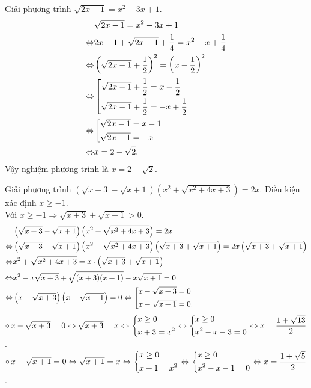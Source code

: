 \begin{bt}%
	Giải phương trình $\sqrt{2x-1}=x^2-3x+1$.
	\loigiai
	{
		\begin{align*}
		& \sqrt{2x-1}=x^2-3x+1 \\
		\Leftrightarrow & 2x-1 +\sqrt{2x-1} +\dfrac{1}{4}=x^2-x+\dfrac{1}{4}\\
		\Leftrightarrow & \left(\sqrt{2x-1} +\dfrac{1}{2}\right)^2=\left(x-\dfrac{1}{2}\right)^2 \\
		\Leftrightarrow & \left[\begin{aligned}&\sqrt{2x-1} +\dfrac{1}{2}=x-\dfrac{1}{2} \\& \sqrt{2x-1} +\dfrac{1}{2}=-x+\dfrac{1}{2}\end{aligned}\right. \\
		\Leftrightarrow & \left[\begin{aligned}&\sqrt{2x-1}=x-1 \\&\sqrt{2x-1}=-x\end{aligned}\right. \\
		\Leftrightarrow & x=2-\sqrt{2}.
		\end{align*}Vậy nghiệm phương trình là $x=2-\sqrt{2}$. 
	}
\end{bt}


\begin{bt}%
	Giải phương trình $ \left(\sqrt{x+3}-\sqrt{x+1}\right)\left(x^2+\sqrt{x^2+4x+3}\right)=2x$.
	\loigiai
	{
		Điều kiện xác định $ x\ge-1 $.\\
		Với $ x \ge-1 \Rightarrow \sqrt{x+3}+\sqrt{x+1}>0 $.
		\begin{align*}
		& \left(\sqrt{x+3}-\sqrt{x+1}\right)\left(x^2+\sqrt{x^2+4x+3}\right)=2x \\ 
		\Leftrightarrow & \left(\sqrt{x+3}-\sqrt{x+1}\right)\left(x^2+\sqrt{x^2+4x+3}\right)\left(\sqrt{x+3}+\sqrt{x+1}\right)=2x\left(\sqrt{x+3}+\sqrt{x+1}\right) \\ 
		\Leftrightarrow & x^2+\sqrt{x^2+4x+3}=x\cdot\left(\sqrt{x+3}+\sqrt{x+1}\right) \\
		\Leftrightarrow & x^2-x\sqrt{x+3}+\sqrt{(x+3)(x+1)}-x\sqrt{x+1}=0 \\
		\Leftrightarrow & \left(x-\sqrt{x+3}\right)\left(x-\sqrt{x+1}\right)=0\Leftrightarrow \left[\begin{aligned}
			& x-\sqrt{x+3}=0\\ 
			& x-\sqrt{x+1}=0.\end{aligned}\right. 		
		\end{align*}
		$\circ \, x-\sqrt{x+3}=0 \Leftrightarrow \sqrt{x+3}=x\Leftrightarrow \left\{\begin{aligned}
			& x\ge 0 \\ 
			& x+3=x^2 \\\end{aligned}\right.\Leftrightarrow \left\{\begin{aligned}
			& x\ge 0 \\ 
			& x^2-x-3=0 \\\end{aligned}\right.\Leftrightarrow x=\dfrac{1+\sqrt{13}}{2} $.\\
		$\circ \, x-\sqrt{x+1}=0 \Leftrightarrow \sqrt{x+1}=x\Leftrightarrow \left\{\begin{aligned}
			& x\ge 0 \\ 
			& x+1=x^2 \\\end{aligned}\right.\Leftrightarrow \left\{\begin{aligned}
			& x\ge 0 \\ 
			& x^2-x-1=0 \\\end{aligned}\right.\Leftrightarrow x=\dfrac{1+\sqrt{5}}{2} $. \\
	}
\end{bt}



